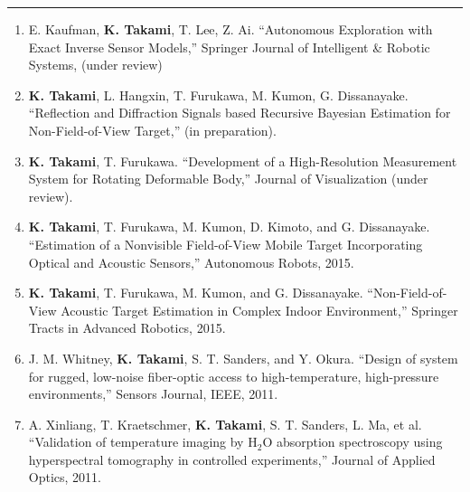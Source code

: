 \documentclass[10pt,letterpaper]{article}
\newcommand{\sect}[1]{\vspace{3mm}{\centering {\bf \large \scshape \uppercase{#1}} \par}  {\color{blue} \vskip 2mm \hrule height 1pt}\vspace{2mm}}
\begin{document}
\sect{Selected Journal Papers}
  \begin{enumerate}
  \item E. Kaufman, {\bf K. Takami}, T. Lee, Z. Ai. ``Autonomous Exploration with Exact Inverse Sensor Models,'' Springer Journal of Intelligent \& Robotic Systems, (under review)

  \item {\bf K. Takami}, L. Hangxin, T. Furukawa, M. Kumon, G. Dissanayake. ``Reflection and Diffraction Signals based Recursive Bayesian Estimation for Non-Field-of-View Target,'' (in preparation).

  \item {\bf K. Takami}, T. Furukawa. ``Development of a High-Resolution Measurement System for Rotating Deformable Body,'' Journal of Visualization (under review).

  \item {\bf K. Takami}, T. Furukawa, M. Kumon, D. Kimoto, and G. Dissanayake. ``Estimation of a Nonvisible Field-of-View Mobile Target Incorporating Optical and Acoustic Sensors,'' Autonomous Robots, 2015.

  \item {\bf K. Takami}, T. Furukawa, M. Kumon, and G. Dissanayake. ``Non-Field-of-View Acoustic Target Estimation in Complex Indoor Environment,'' Springer Tracts in Advanced Robotics, 2015.

  \item J. M. Whitney, {\bf K. Takami}, S. T. Sanders, and Y. Okura. ``Design of system for rugged, low-noise fiber-optic access to high-temperature, high-pressure environments,'' Sensors Journal, IEEE, 2011.

  \item A. Xinliang, T. Kraetschmer, {\bf K. Takami}, S. T. Sanders, L. Ma, et al. ``Validation of temperature imaging by H$_2$O absorption spectroscopy using hyperspectral tomography in controlled experiments,'' Journal of Applied Optics, 2011.
\end{enumerate}
\end{document}
